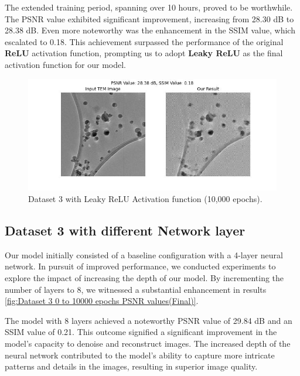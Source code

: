 \vspace{10pt}
The extended training period, spanning over 10 hours, proved to be worthwhile. The PSNR value exhibited significant improvement, increasing from 28.30 dB to 28.38 dB. Even more noteworthy was the enhancement in the SSIM value, which escalated to 0.18. This achievement surpassed the performance of the original \textbf{ReLU} activation function, prompting us to adopt \textbf{Leaky ReLU} as the final activation function for our model.

\begin{figure}[H]
    \centering
    \includegraphics[width=.9\textwidth]{img/Dataset_3_with_1000_epochs_Leaky_ReLU.jpg}
    \caption{Dataset 3 with  Leaky ReLU Activation function (10,000 epochs).}\label{fig:Dataset_3_with_Leaky_ReLU_10000_epochs.jpg}
\end{figure}

\subsection{Dataset 3 with different Network layer}
Our model initially consisted of a baseline configuration with a 4-layer neural network. In pursuit of improved performance, we conducted experiments to explore the impact of increasing the depth of our model. By incrementing the number of layers to 8, we witnessed a substantial enhancement in results \ref{fig:Dataset 3 0 to 10000 epochs PSNR values(Final)}.
\vspace{10pt}

The model with 8 layers achieved a noteworthy PSNR value of 29.84 dB and an SSIM value of 0.21. This outcome signified a significant improvement in the model's capacity to denoise and reconstruct images. The increased depth of the neural network contributed to the model's ability to capture more intricate patterns and details in the images, resulting in superior image quality.

